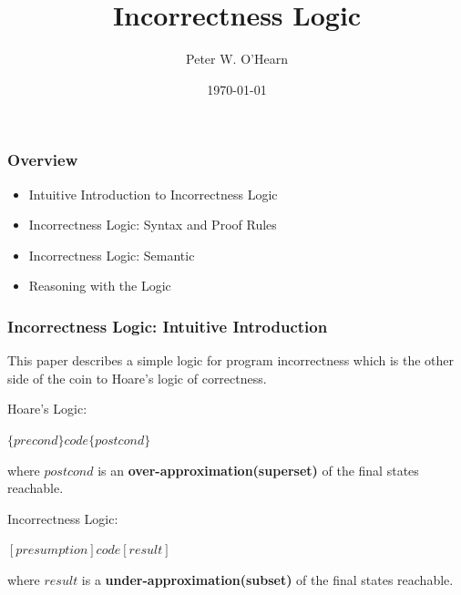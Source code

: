 \documentclass[11pt]{beamer}
\title{Incorrectness Logic}
\author{Peter W. O'Hearn}
\date{\today}
\begin{document}
\maketitle
\begin{frame}\frametitle{Overview}
\begin{itemize}
\item Intuitive Introduction to Incorrectness Logic
\item Incorrectness Logic: Syntax and Proof Rules
\item Incorrectness Logic: Semantic 
\item Reasoning with the Logic
\end{itemize}
\end{frame}
\begin{frame}\frametitle{Incorrectness Logic: Intuitive Introduction}

This paper describes a simple logic for program incorrectness which is the other side of the coin to Hoare's logic of correctness.

Hoare's Logic:
\begin{center}
$\{precond\}code\{postcond\}$
\end{center}
where $postcond$ is an \textbf{over-approximation(superset)} of the final states reachable.

Incorrectness Logic: 
\begin{center}
$[presumption]code[result]$

\end{center}
where $result$ is a \textbf{under-approximation(subset)} of the final states reachable. 
\end{frame}
\end{document}
